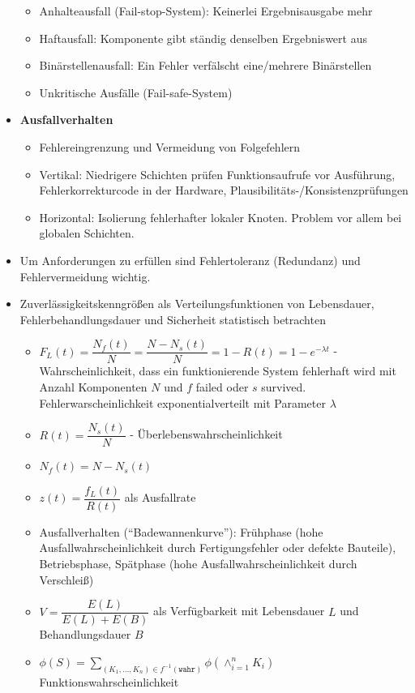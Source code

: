 \begin{itemize}
\begin{itemize}
		\item Anhalteausfall (Fail-stop-System): Keinerlei Ergebnisausgabe mehr
		\item Haftausfall: Komponente gibt ständig denselben Ergebniswert aus
		\item Binärstellenausfall: Ein Fehler verfälscht eine/mehrere Binärstellen
		\item Unkritische Ausfälle (Fail-safe-System)
	\end{itemize}
	\item \textbf{Ausfallverhalten}
	\begin{itemize}
		\item Fehlereingrenzung und Vermeidung von Folgefehlern
			\item Vertikal: Niedrigere Schichten prüfen Funktionsaufrufe vor Ausführung, Fehlerkorrekturcode in der Hardware, Plausibilitäts-/Konsistenzprüfungen
			\item Horizontal: Isolierung fehlerhafter lokaler Knoten. Problem vor allem bei globalen Schichten.		 
	\end{itemize}
	\item Um Anforderungen zu erfüllen sind Fehlertoleranz (Redundanz) und Fehlervermeidung wichtig.
	\item Zuverlässigkeitskenngrößen als Verteilungsfunktionen von Lebensdauer, Fehlerbehandlungsdauer und Sicherheit statistisch betrachten
	\begin{itemize}
		\item $F_L(t)=\dfrac{N_f(t)}{N}=\dfrac{N-N_s(t)}{N}=1-R(t)=1-e^{-\lambda t}$ - Wahrscheinlichkeit, dass ein funktionierende System fehlerhaft wird mit Anzahl Komponenten $N$ und $f$ failed oder $s$ survived. Fehlerwarscheinlichkeit exponentialverteilt mit Parameter $\lambda$
		\item $R(t)=\dfrac{N_s(t)}{N}$ - Überlebenswahrscheinlichkeit
		\item $N_f(t)=N-N_s(t)$
		\item $z(t)=\dfrac{f_L(t)}{R(t)}$ als Ausfallrate
		\item Ausfallverhalten ("`Badewannenkurve"'): Frühphase (hohe Ausfallwahrscheinlichkeit durch Fertigungsfehler oder defekte Bauteile), Betriebsphase, Spätphase (hohe Ausfallwahrscheinlichkeit durch Verschleiß)
		\item $V=\dfrac{E(L)}{E(L)+E(B)}$ als Verfügbarkeit mit Lebensdauer $L$ und Behandlungsdauer $B$
		\item $\phi(S)=\sum_{(K_1,\dots,K_n)\in f^{-1}(\texttt{wahr})}\phi(\wedge_{i=1}^n K_i) $ Funktionswahrscheinlichkeit

\end{itemize}
\end{itemize}
